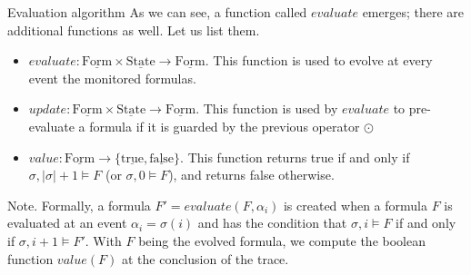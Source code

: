 \documentclass[aspectratio=169,t,xcolor=table]{beamer}
\begin{document}
\begin{frame}[allowframebreaks]{Evaluation algorithm}
    As we can see, a function called $evaluate$ emerges; there are additional functions as well. Let us list them.
    \begin{itemize}
        \item $evaluate: \underline{\text{Form}} \times \underline{\text{State}} \to \underline{\text{Form}}$. This function is used to evolve at every event the monitored formulas.
        \item $update: \underline{\text{Form}} \times \underline{\text{State}} \to \underline{\text{Form}}$. This function is used by $evaluate$ to pre-evaluate a formula if it is guarded by the previous operator $\odot$
        \item $value : \underline{\text{Form}} \rightarrow \{ \underline{\text{true}}, \underline{\text{false}} \}$. This function returns true if and only if $\sigma,|\sigma|+1 \models F$ (or $\sigma,0 \models F$), and returns false otherwise.
    \end{itemize}
    \begin{block}{Note.}
        Formally, a formula $F' = evaluate(F, \alpha_i)$ is created when a formula $F$ is evaluated at an event $\alpha_i = \sigma(i)$ and has the condition that $\sigma, i \models F$ if and only if $\sigma, i+1 \models F'$. With $F$ being the evolved formula, we compute the boolean function $value(F)$ at the conclusion of the trace.
    \end{block}


\end{frame}
\end{document}
